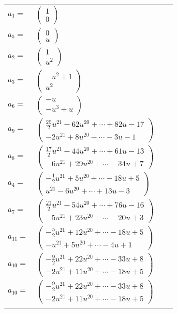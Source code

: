\documentclass[1p]{elsarticle_modified}
\theoremstyle{definition}
\begin{document}
\begin{tabular}{m{7pt} m{180pt} m{7pt} m{180pt} }
\flushright $a_{1}=$&$\begin{pmatrix}1\\0\end{pmatrix}$ \\
\flushright $a_{5}=$&$\begin{pmatrix}0\\u\end{pmatrix}$ \\
\flushright $a_{2}=$&$\begin{pmatrix}1\\u^2\end{pmatrix}$ \\
\flushright $a_{3}=$&$\begin{pmatrix}- u^2+1\\u^2\end{pmatrix}$ \\
\flushright $a_{6}=$&$\begin{pmatrix}- u\\- u^3+u\end{pmatrix}$ \\
\flushright $a_{9}=$&$\begin{pmatrix}\frac{25}{2} u^{21}-62 u^{20}+\cdots+82 u-17\\-2 u^{21}+8 u^{20}+\cdots-3 u-1\end{pmatrix}$ \\
\flushright $a_{8}=$&$\begin{pmatrix}\frac{17}{2} u^{21}-44 u^{20}+\cdots+61 u-13\\-6 u^{21}+29 u^{20}+\cdots-34 u+7\end{pmatrix}$ \\
\flushright $a_{4}=$&$\begin{pmatrix}-\frac{1}{2} u^{21}+5 u^{20}+\cdots-18 u+5\\u^{21}-6 u^{20}+\cdots+13 u-3\end{pmatrix}$ \\
\flushright $a_{7}=$&$\begin{pmatrix}\frac{21}{2} u^{21}-54 u^{20}+\cdots+76 u-16\\-5 u^{21}+23 u^{20}+\cdots-20 u+3\end{pmatrix}$ \\
\flushright $a_{11}=$&$\begin{pmatrix}-\frac{5}{2} u^{21}+12 u^{20}+\cdots-18 u+5\\- u^{21}+5 u^{20}+\cdots-4 u+1\end{pmatrix}$ \\
\flushright $a_{10}=$&$\begin{pmatrix}-\frac{9}{2} u^{21}+22 u^{20}+\cdots-33 u+8\\-2 u^{21}+11 u^{20}+\cdots-18 u+5\end{pmatrix}$\\ \flushright $a_{10}=$&$\begin{pmatrix}-\frac{9}{2} u^{21}+22 u^{20}+\cdots-33 u+8\\-2 u^{21}+11 u^{20}+\cdots-18 u+5\end{pmatrix}$\\&\end{tabular}
\end{document}
